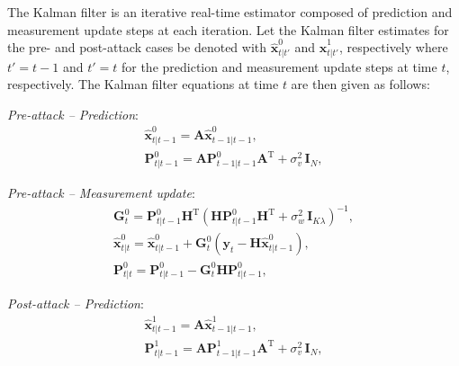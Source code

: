 \documentclass[onecolumn]{IEEEtran}
\begin{document}
The Kalman filter is an iterative real-time estimator composed of prediction and measurement update steps at each iteration. Let the Kalman filter estimates for the pre- and post-attack cases be denoted with $\hat{\mathbf{x}}_{t|t'}^0$ and $\hat{\mathbf{x}}_{t|t'}^1$, respectively where $t' = t-1$ and $t' = t$ for the prediction and measurement update steps at time $t$, respectively. The Kalman filter equations at time $t$ are then given as follows:

\emph{Pre-attack -- Prediction}:
\begin{gather} \nonumber
\hat{\mathbf{x}}_{t|t-1}^0 = \mathbf{A} \hat{\mathbf{x}}_{t-1|t-1}^0, \\ \label{eq:pred_fdata_null}
\mathbf{P}_{t|t-1}^0 = \mathbf{A} \mathbf{P}_{t-1|t-1}^0 \mathbf{A}^\mathrm{T} + \sigma_v^2 \, \mathbf{I}_N,
\end{gather}

\emph{Pre-attack -- Measurement update}:
\begin{gather} \nonumber
\mathbf{G}_{t}^0 = \mathbf{P}_{t|t-1}^0 \mathbf{H}^\mathrm{T} (\mathbf{H} \mathbf{P}_{t|t-1}^0 \mathbf{H}^\mathrm{T} + \sigma_w^2 \, \mathbf{I}_{K \lambda})^{-1}, \\ \nonumber
\hat{\mathbf{x}}_{t|t}^0 = \hat{\mathbf{x}}_{t|t-1}^0 + \mathbf{G}_{t}^0 (\mathbf{y}_t - \mathbf{H} \hat{\mathbf{x}}_{t|t-1}^0), \\ \label{eq:meas_upd_fdata_null}
\mathbf{P}_{t|t}^0 = \mathbf{P}_{t|t-1}^0 - \mathbf{G}_{t}^0 \mathbf{H} \mathbf{P}_{t|t-1}^0,
\end{gather}

\emph{Post-attack -- Prediction}:
\begin{gather} \nonumber
\hat{\mathbf{x}}_{t|t-1}^1 = \mathbf{A} \hat{\mathbf{x}}_{t-1|t-1}^1, \\ \label{eq:pred_fdata_alter}
\mathbf{P}_{t|t-1}^1 = \mathbf{A} \mathbf{P}_{t-1|t-1}^1 \mathbf{A}^\mathrm{T} + \sigma_v^2 \, \mathbf{I}_N,
\end{gather}
\end{document}
